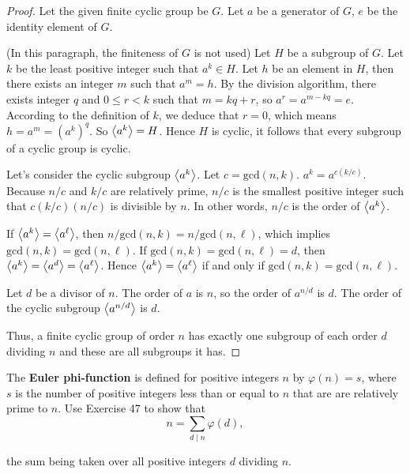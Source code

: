\begin{proof}
    Let the given finite cyclic group be $G$. Let $a$ be a generator of $G$, $e$ be the identity element of $G$.

    (In this paragraph, the finiteness of $G$ is not used) Let $H$ be a subgroup of $G$. Let $k$ be the least positive integer such that $a^{k}\in H$. Let $h$ be an element in $H$, then there exists an integer $m$ such that $a^{m} = h$. By the division algorithm, there exists integer $q$ and $0\leq r < k$ such that $m = kq + r$, so $a^{r} = a^{m-kq} = e$. According to the definition of $k$, we deduce that $r = 0$, which means $h = a^{m} = {(a^{k})}^{q}$. So $\left\langle{a^{k}}\right\rangle = H$. Hence $H$ is cyclic, it follows that every subgroup of a cyclic group is cyclic.

    \hrulefill{}

    Let's consider the cyclic subgroup $\left\langle{a^{k}}\right\rangle$. Let $c = \text{gcd}(n,k)$. $a^{k} = a^{c(k/c)}$. Because $n/c$ and $k/c$ are relatively prime, $n/c$ is the smallest positive integer such that $c(k/c)(n/c)$ is divisible by $n$. In other words, $n/c$ is the order of $\left\langle{a^{k}}\right\rangle$.

    If $\left\langle{a^{k}}\right\rangle = \left\langle{a^{\ell}}\right\rangle$, then $n/\text{gcd}(n,k) = n/\text{gcd}(n,\ell)$, which implies $\text{gcd}(n,k) = \text{gcd}(n,\ell)$. If $\text{gcd}(n,k) = \text{gcd}(n,\ell) = d$, then $\left\langle{a^{k}}\right\rangle = \left\langle{a^{d}}\right\rangle = \left\langle{a^{\ell}}\right\rangle$. Hence $\left\langle{a^{k}}\right\rangle = \left\langle{a^{\ell}}\right\rangle$ if and only if $\text{gcd}(n,k) = \text{gcd}(n,\ell)$.

    Let $d$ be a divisor of $n$. The order of $a$ is $n$, so the order of $a^{n/d}$ is $d$. The order of the cyclic subgroup $\left\langle{a^{n/d}}\right\rangle$ is $d$.

    Thus, a finite cyclic group of order $n$ has exactly one subgroup of each order $d$ dividing $n$ and these are all subgroups it has.
\end{proof}

\begin{exercise}
    The \textbf{Euler phi-function} is defined for positive integers $n$ by $\varphi(n) = s$, where $s$ is the number of positive integers less than or equal to $n$ that are are relatively prime to $n$. Use Exercise 47 to show that
    \[
        n = \sum_{d \mid n}\varphi(d),
    \]

    the sum being taken over all positive integers $d$ dividing $n$.
\end{exercise}

